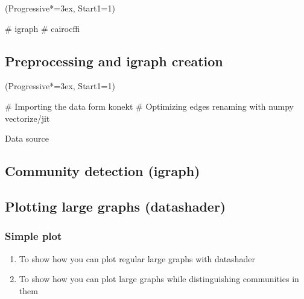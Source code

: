 \documentclass[12pt, a4paper]{article}
\let\OldEasylist\easylist
\let\OldEndEasylist\endeasylist
\renewenvironment{easylist}{%
    \OldEasylist%
    \ListProperties(Progressive*=3ex, Start1=1)%
}{%
    \OldEndEasylist%
}%
\begin{document}
\begin{easylist}
  # igraph
  # cairocffi
\end{easylist}

\cite{csardi2006igraph}

\newpage
\subsection{Preprocessing and igraph creation}
\begin{easylist}
# Importing the data form konekt
# Optimizing edges renaming with numpy vectorize/jit
\end{easylist}

Data source \cite{youtube_source}

\newpage
\subsection{Community detection (igraph)}

\newpage
\subsection{Plotting large graphs (datashader)}
\subsubsection{Simple plot}

\begin{enumerate}
  \item To show how you can plot regular large graphs with datashader
  \item To show how you can plot large graphs while distinguishing communities in them
\end{enumerate}
\end{document}
